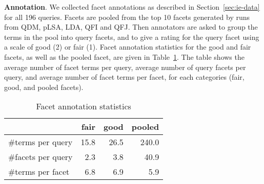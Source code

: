 \textbf{Annotation}. We collected facet annotations as described in Section~\ref{sec:ie-data} for all 196 queries. Facets are pooled from the top 10 facets generated by runs from QDM, pLSA, LDA, QFI and QFJ. Then annotators are asked to group the terms in the pool into query facets, and to give a rating for the query facet using a scale of good (2) or fair (1). Facet annotation statistics for the good and fair facets, as well as the pooled facet, are given in Table~\ref{tab:facet-annotations}. The table shows the average number of facet terms per query, average number of query facets per query, and average number of facet terms per facet, for each categories (fair, good, and pooled facets).

\begin{table}[H]
\centering
\caption{Facet annotation statistics}
\label{tab:facet-annotations}
\begin{tabular}{|l|r|r|r|} \hline
& fair & good & pooled\\ \hline
\#terms per query & 15.8 & 26.5 & 240.0\\ 
\#facets per query & 2.3 & 3.8 & 40.9 \\ 
\#terms per facet & 6.8 & 6.9 & 5.9 \\ \hline
\end{tabular}
\end{table}


